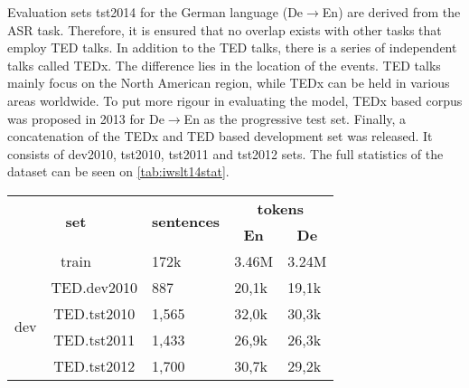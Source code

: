 Evaluation sets tst2014 for the German language (De$\rightarrow$En) are derived from the ASR task. Therefore, it is ensured that no overlap exists with other tasks that employ TED talks. In addition to the TED talks, there is a series of independent talks called TEDx. The difference lies in the location of the events. TED talks mainly focus on the North American region, while TEDx can be held in various areas worldwide. To put more rigour in evaluating the model, TEDx based corpus was proposed in 2013 for De$\rightarrow$En as the progressive test set. Finally, a concatenation of the TEDx and TED based development set was released. It consists of dev2010, tst2010, tst2011 and tst2012 sets. The full statistics of the dataset can be seen on \cref{tab:iwslt14stat}.

\begin{table}[h]
    \centering
    \begin{tabular}{@{}cclll@{}}
        \toprule
        \multicolumn{2}{c}{\multirow{2}{*}{\textbf{set}}} & \multicolumn{1}{c}{\multirow{2}{*}{\textbf{sentences}}} & \multicolumn{2}{c}{\textbf{tokens}}                                           \\ %
        \multicolumn{2}{c}{}                              & \multicolumn{1}{c}{}                                    & \multicolumn{1}{c}{\textbf{En}}     & \multicolumn{1}{c}{\textbf{De}}         \\ \toprule
        \multicolumn{2}{c}{train}                         & 172k                                                    & 3.46M                               & 3.24M                                   \\ \midrule
        \multirow{4}{*}{dev}                              & TED.dev2010                                             & 887                                 & 20,1k                           & 19,1k \\
                                                          & TED.tst2010                                             & 1,565                               & 32,0k                           & 30,3k \\
                                                          & TED.tst2011                                             & 1,433                               & 26,9k                           & 26,3k \\
                                                          & TED.tst2012                                             & 1,700                               & 30,7k                           & 29,2k \\ \midrule

\end{tabular}
\end{table}
